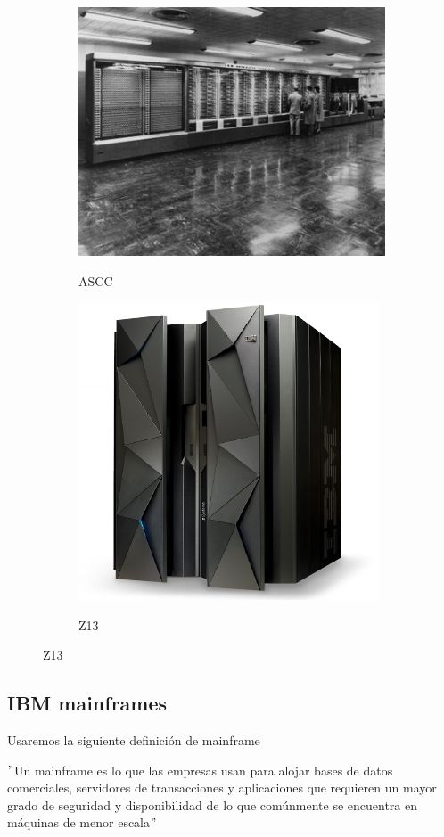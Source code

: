 \documentclass[paper=a4, fontsize=10pt]{scrartcl} %
\numberwithin{equation}{section} %
\numberwithin{figure}{section} %
\numberwithin{table}{section} %
\begin{document}
\begin{figure}[H]
	\centering
	\begin{subfigure}{.5\textwidth}
		\centering
		\href{https://www-03.ibm.com/ibm/history/exhibits/markI/markI_intro.html}{		\includegraphics[width=.75\linewidth]{./Imagenes/ascc.jpg}}
		\caption{ASCC}
		\label{fig:ascc}
	\end{subfigure}%
	\begin{subfigure}{.5\textwidth}
		\centering
		\href{https://www-03.ibm.com/systems/z/hardware/z13.html}{\includegraphics[width=.75\linewidth]{./Imagenes/z13.jpg}}
		\caption{Z13}
		\label{fig:z13}
	\end{subfigure}
\end{figure}



\subsection{IBM mainframes}
Usaremos la siguiente definición de mainframe \cite{ibm-mainframes}
\begin{center}
	$"$Un mainframe es lo que las empresas usan para alojar bases de datos comerciales, servidores de transacciones y aplicaciones que requieren un mayor grado de seguridad y disponibilidad de lo que comúnmente se encuentra en máquinas de menor escala$"$ 
\end{center}
\end{document}
